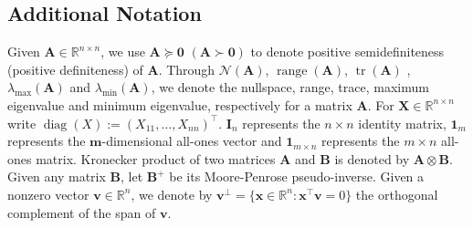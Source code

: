 \documentclass[a4paper,fleqn]{cas-sc}
\newcommand{\X}{\mathbf{X}}
\newcommand{\I}{\mathbf{I}}
\newcommand{\1}{\mathbf{1}}
\newcommand{\A}{\mathbf{A}}
\newcommand{\x}{\mathbf{x}}
\newcommand{\B}{\mathbf{B}}
\newcommand{\bv}{\mathbf{v}}
\newcommand{\bm}{\mathbf{m}}
\DeclareMathOperator{\diag}{diag}
\DeclareMathOperator{\range}{range}
\DeclareMathOperator{\tr}{tr}
\begin{document}
\subsection{Additional Notation}
Given $\A \in \mathbb{R}^{n \times n}$, we use $\A \succeq \mathbf{0}$ $(\A \succ \mathbf{0})$ to denote positive semidefiniteness (positive definiteness) of $\A$. Through $\mathcal{N}(\A)$, $\range(\A)$, $\tr(\A)$ , $\lambda_{\max}(\A)$ and $\lambda_{\min}(\A)$, we denote the nullspace, range, trace, maximum eigenvalue and minimum eigenvalue, respectively for a matrix $\A$. For $\X\in\mathbb{R}^{n\times n}$ write $\diag(X):=(X_{11},\dots,X_{nn})^\top$. $\I_n$ represents the $n \times n$ identity matrix, $\1_m$ represents the $\bm$-dimensional all-ones vector and $\1_{m \times n}$ represents the $m \times n$ all-ones matrix. Kronecker product of two matrices $\A$ and $\B$ is denoted by $\A\otimes \B$. Given any matrix $\mathbf{B}$, let $\mathbf{B}^+$ be its Moore-Penrose pseudo-inverse. Given a nonzero vector \( \bv \in \mathbb{R}^n \), we denote by $\mathbf{v}^\perp = \{ \x \in \mathbb{R}^n : \x^{\top} \mathbf{v}  = 0 \}$ the orthogonal complement of the span of \( \mathbf{v} \).
\end{document}
